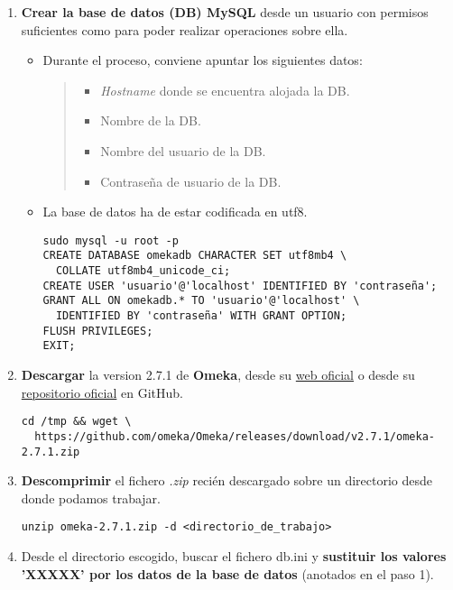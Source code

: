 \begin{enumerate}
\def\labelenumi{\arabic{enumi}.}
\tightlist
\item
  \textbf{Crear la base de datos (DB) MySQL} desde un usuario con
  permisos suficientes como para poder realizar operaciones sobre ella.
  \begin{itemize}
  \item
    Durante el proceso, conviene apuntar los siguientes datos:
    \begin{quote}
    \begin{itemize}
    \tightlist
    \item
      \emph{Hostname} donde se encuentra alojada la DB.
    \item
      Nombre de la DB.
    \item
      Nombre del usuario de la DB.
    \item
      Contraseña de usuario de la DB.
    \end{itemize}
    \end{quote}
  \item
    La base de datos ha de estar codificada en {utf8}.
\begin{verbatim}
sudo mysql -u root -p
CREATE DATABASE omekadb CHARACTER SET utf8mb4 \
  COLLATE utf8mb4_unicode_ci;
CREATE USER 'usuario'@'localhost' IDENTIFIED BY 'contraseña';
GRANT ALL ON omekadb.* TO 'usuario'@'localhost' \
  IDENTIFIED BY 'contraseña' WITH GRANT OPTION;
FLUSH PRIVILEGES;
EXIT;
\end{verbatim}
\end{itemize}
\item
  \textbf{Descargar} la version 2.7.1 de \textbf{Omeka}, desde su \href{https://omeka.org/classic/download/}{web oficial} o desde su \href{http://github.com/omeka/Omeka}{repositorio oficial} en
  GitHub.
\begin{verbatim}
cd /tmp && wget \
  https://github.com/omeka/Omeka/releases/download/v2.7.1/omeka-2.7.1.zip
\end{verbatim}
\item
  \textbf{Descomprimir} el fichero \emph{.zip} recién descargado sobre un
  directorio desde donde podamos trabajar.  
\begin{verbatim}
unzip omeka-2.7.1.zip -d <directorio_de_trabajo>
\end{verbatim}
\item
  Desde el directorio escogido, buscar el fichero {db.ini} y
  \textbf{sustituir los valores 'XXXXX' por los datos de la base de
  datos} (anotados en el paso 1).
\begin{verbatim}

\end{verbatim}
\end{enumerate}
